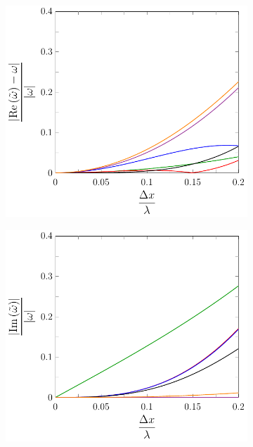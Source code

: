 \begin{figure}
	\centering
	\begin{subfigure}{0.5\textwidth}
		\includegraphics[width=\textwidth]{./chp4/figures/New/ReDispu1Shall.pdf}
	\end{subfigure}%
	\begin{subfigure}{0.5\textwidth}
		\includegraphics[width=\textwidth]{./chp4/figures/New/ImDispu1Shall.pdf}

\end{subfigure}
\end{figure}
